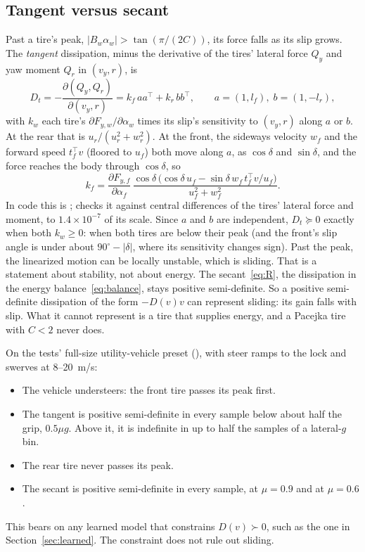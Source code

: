 \documentclass[11pt]{article}
\theoremstyle{remark}
\newcommand{\T}{^{\top}}
\begin{document}
\subsection{Tangent versus secant}
\label{sec:tangent}
Past a tire's peak, $\lvert B_w\alpha_w\rvert>\tan(\pi/(2C))$, its force falls as its slip grows. The
\emph{tangent} dissipation, minus the derivative of the tires' lateral force $Q_y$ and yaw moment
$Q_r$ in $(v_y,r)$, is
\begin{equation}
  D_t=-\frac{\partial(Q_y,Q_r)}{\partial(v_y,r)}=k_f\,aa\T+k_r\,bb\T,\qquad a=(1,l_f),\;b=(1,-l_r),
  \label{eq:tangent}
\end{equation}
with $k_w$ each tire's $\partial F_{y,w}/\partial\alpha_w$ times its slip's sensitivity to $(v_y,r)$
along $a$ or $b$. At the rear that is $u_r/(u_r^2+w_r^2)$. At the front, the sideways velocity $w_f$
and the forward speed $t_f\T v$ (floored to $u_f$) both move along $a$, as $\cos\delta$ and
$\sin\delta$, and the force reaches the body through $\cos\delta$, so
\begin{equation}
  k_f=\frac{\partial F_{y,f}}{\partial\alpha_f}\,
      \frac{\cos\delta\,\big(\cos\delta\,u_f-\sin\delta\,w_f\,t_f\T v/u_f\big)}{u_f^2+w_f^2}.
  \label{eq:kf}
\end{equation}
In code this is ; 
checks it against central differences of the tires' lateral force and moment, to
$1.4\times10^{-7}$ of its scale. Since $a$ and $b$ are independent, $D_t\succeq0$ exactly when both
$k_w\ge0$: when both tires are below their peak (and the front's slip angle is under about
$90^\circ-\lvert\delta\rvert$, where its sensitivity changes sign). Past the peak, the linearized
motion can be locally unstable, which is sliding. That is a statement about
stability, not about energy. The secant~\eqref{eq:R}, the dissipation in the energy
balance~\eqref{eq:balance}, stays positive semi-definite. So a positive semi-definite dissipation of
the form $-D(v)v$ can represent sliding: its gain falls with slip. What it cannot represent is a
tire that supplies energy, and a Pacejka tire with $C<2$ never does.

On the tests' full-size utility-vehicle preset (),
with steer ramps to the lock and swerves at 8--20~m/s:
\begin{itemize}
  \item The vehicle understeers: the front tire passes its peak first.
  \item The tangent is positive semi-definite in every sample below about half the grip,
        $0.5\mu g$. Above it, it is indefinite in up to half the samples of a lateral-$g$ bin.
  \item The rear tire never passes its peak.
  \item The secant is positive semi-definite in every sample, at $\mu=0.9$ and at $\mu=0.6$.
\end{itemize}
This bears on any learned model that constrains $D(v)\succ0$, such as the one in
Section~\ref{sec:learned}. The constraint does not rule out sliding.
\end{document}
